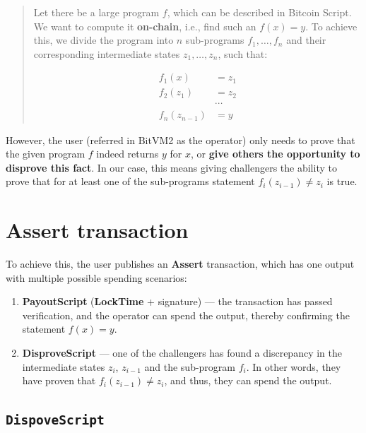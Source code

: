 \documentclass{iacrtrans}
\begin{document}
\begin{quote}
  Let there be a large program \(f\), which can be described in
  Bitcoin Script. We want to compute it \textbf{on-chain}, i.e., find
  such an \(f(x) = y\). To achieve this, we divide the program into
  \(n\) sub-programs \(f_1, \ldots, f_n\) and their corresponding
  intermediate states \(z_1, \ldots, z_n\), such that:

  \begin{equation}
    \begin{aligned}
      f_1(x) &= z_1 \\
      f_2(z_1) &= z_2 \\
      &\cdots \\
      f_n(z_{n-1}) &= y
    \end{aligned}
  \end{equation}
\end{quote}

However, the user (referred in BitVM2 as the operator) only needs to
prove that the given program \(f\) indeed returns \(y\) for \(x\), or
\textbf{give others the opportunity to disprove this fact}. In our
case, this means giving challengers the ability to prove that for at
least one of the sub-programs statement \(f_i(z_{i-1}) \neq z_i\) is
true.

\section{\textbf{Assert} transaction}\label{sec:assert-tx}

To achieve this, the user publishes an \textbf{Assert} transaction,
which has one output with multiple possible spending scenarios:

\begin{enumerate}
  \item \textbf{PayoutScript} (\textbf{LockTime} + signature) --- the
    transaction has passed verification, and the operator can spend the
    output, thereby confirming the statement \(f(x) = y\).
  \item \textbf{DisproveScript} --- one of the challengers has found a
    discrepancy in the intermediate states \(z_i\), \(z_{i-1}\) and the
    sub-program \(f_i\). In other words, they have proven that
    \(f_i(z_{i-1}) \neq z_i\), and thus, they can spend the output.
\end{enumerate}

\subsection{\texttt{DispoveScript}}\label{sec:dispove-script}
\end{document}
